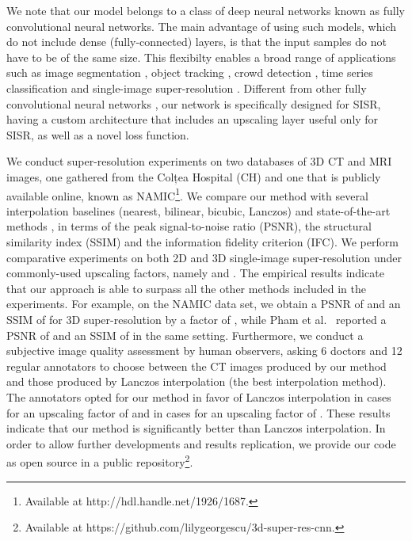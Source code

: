 \documentclass{ieeeaccess}
\begin{document}
We note that our model belongs to a class of deep neural networks known as fully convolutional neural networks. The main advantage of using such models, which do not include dense (fully-connected) layers, is that the input samples do not have to be of the same size. This flexibilty enables a broad range of applications such as image segmentation \cite{Long-CVPR-2015}, object tracking \cite{Wang-ICCV-2015}, crowd detection \cite{Castellano-SOFSEM-2020}, time series classification \cite{Karim-Access-2017} and single-image super-resolution \cite{Du-AS-2019, Hatvani-TRPMS-2018, Yu-ICIP-2017, Zhao-TMI-2019}. Different from other fully convolutional neural networks \cite{Du-AS-2019, Hatvani-TRPMS-2018, Yu-ICIP-2017, Zhao-TMI-2019,Long-CVPR-2015,Wang-ICCV-2015,Castellano-SOFSEM-2020,Karim-Access-2017}, our network is specifically designed for SISR, having a custom architecture that includes an upscaling layer \cite{Shi-CVPR-2016} useful only for SISR, as well as a novel loss function.

We conduct super-resolution experiments on two databases of 3D CT and MRI images, one gathered from the Colțea Hospital (CH) and one that is publicly available online, known as NAMIC\footnote{Available at {http://hdl.handle.net/1926/1687}.}. We compare our method with several interpolation baselines (nearest, bilinear, bicubic, Lanczos) and state-of-the-art methods \cite{Du-AS-2019, Pham-CMIG-2019, You-TMI-2019, ZENG-CBM-2018}, in terms of the peak signal-to-noise ratio (PSNR), the structural similarity index (SSIM) and the information fidelity criterion (IFC). We perform comparative experiments on both 2D and 3D single-image super-resolution under commonly-used upscaling factors, namely  and . The empirical results indicate that our approach is able to surpass all the other methods included in the experiments. For example, on the NAMIC data set, we obtain a PSNR of  and an SSIM of  for 3D super-resolution by a factor of , while Pham et al.~\cite{Pham-CMIG-2019} reported a PSNR of  and an SSIM of  in the same setting. Furthermore, we conduct a subjective image quality assessment by human observers, asking 6 doctors and 12 regular annotators to choose between the CT images produced by our method and those produced by Lanczos interpolation (the best interpolation method). The annotators opted for our method in favor of Lanczos interpolation in  cases for an upscaling factor of  and in  cases for an upscaling factor of . These results indicate that our method is significantly better than Lanczos interpolation. In order to allow further developments and results replication, we provide our code as open source in a public repository\footnote{Available at {https://github.com/lilygeorgescu/3d-super-res-cnn}.}.
\end{document}

